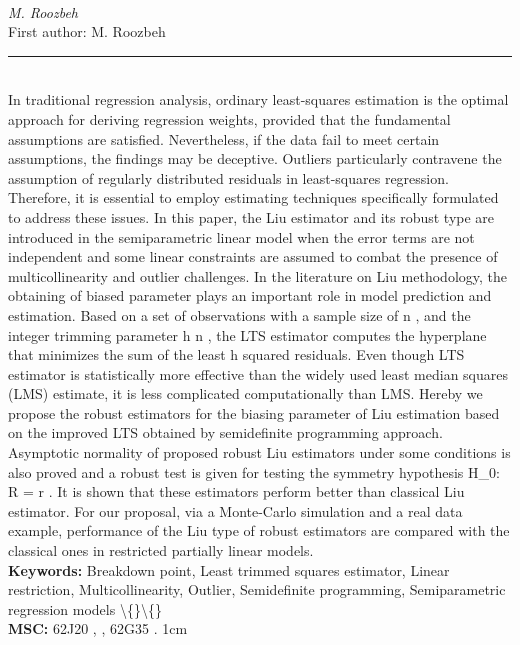 \documentclass[10pt,twoside]{article}
\begin{document}
\noindent\begin{minipage}[t][\textheight]{\textwidth}
\\[0.35em]
{\itshape M. Roozbeh}\\[0.2em]
{\footnotesize First author: M. Roozbeh}\\[0.45em]
\noindent\rule{\textwidth}{0.3pt}\\[0.4em]
{\footnotesize  In traditional regression analysis, ordinary least-squares estimation is the optimal approach for deriving regression weights, provided that the fundamental assumptions are satisfied. Nevertheless, if the data fail to meet certain assumptions, the findings may be deceptive. Outliers particularly contravene the assumption of regularly distributed residuals in least-squares regression. Therefore, it is essential to employ estimating techniques specifically formulated to address these issues. In this paper, the Liu estimator and its robust type are introduced in the semiparametric linear model when the error terms are not independent and some linear constraints are assumed to combat the presence of multicollinearity and outlier challenges. In the literature on Liu methodology, the obtaining of biased parameter plays an important role in model prediction and estimation. Based on a set of observations with a sample size of n , and the integer trimming parameter h n , the LTS estimator computes the hyperplane that minimizes the sum of the least h squared residuals. Even though LTS estimator is statistically more effective than the widely used least median squares (LMS) estimate, it is less complicated computationally than LMS. Hereby we propose the robust estimators for the biasing parameter of Liu estimation based on the improved LTS obtained by semidefinite programming approach. Asymptotic normality of proposed robust Liu estimators under some conditions is also proved and a robust test is given for testing the symmetry hypothesis H\_0: R = r . It is shown that these estimators perform better than classical Liu estimator. For our proposal, via a Monte-Carlo simulation and a real data example, performance of the Liu type of robust estimators are compared with the classical ones in restricted partially linear models.}\\[0.4em]
{\footnotesize\bfseries Keywords:} {\footnotesize Breakdown point, Least trimmed squares estimator, Linear restriction, Multicollinearity, Outlier, Semidefinite programming, Semiparametric regression models \textbackslash\{\}\textbackslash\{\}}\\[0.15em]
{\footnotesize\bfseries MSC:} {\footnotesize 62J20 , , 62G35 . 1cm}\\
\vfill
\end{minipage}
\newpage
\end{document}
